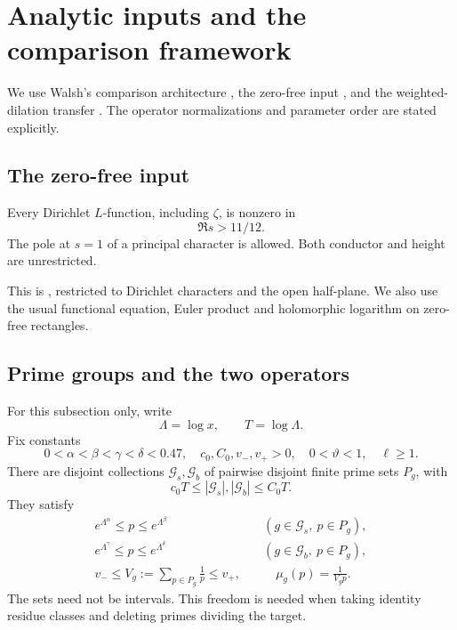 \section{Analytic inputs and the comparison framework}\label{sec:inputs}

We use Walsh's comparison architecture \cite[Sections 2--7]{walsh},
the zero-free input \cite[Theorem 3.1]{zerofree}, and the
weighted-dilation transfer \cite[Section 3]{weightedgraphs}.
The operator normalizations and parameter order are stated explicitly.

\subsection{The zero-free input}

\begin{proposition}\label{prop:zf}
Every Dirichlet \(L\)-function, including \(\zeta\), is nonzero in
\[
                         \Re s>11/12.
\]
The pole at \(s=1\) of a principal character is allowed. Both conductor
and height are unrestricted.
\end{proposition}

This is \cite[Theorem 3.1, printed p.~10]{zerofree}, restricted to
Dirichlet characters and the open half-plane. We also use the usual
functional equation, Euler product and holomorphic logarithm on
zero-free rectangles.

\subsection{Prime groups and the two operators}

For this subsection only, write
\[
                \Lambda=\log x,\qquad T=\log\Lambda.
\]
Fix constants
\[
 0<\alpha<\beta<\gamma<\delta<0.47,\quad
 c_0,C_0,v_-,v_+>0,\quad 0<\vartheta<1,\quad \ell\ge1.
\]
There are disjoint collections \(\mathcal G_s,\mathcal G_b\) of
pairwise disjoint finite prime sets \(P_g\), with
\[
 c_0T\le|\mathcal G_s|,|\mathcal G_b|\le C_0T.
\]
They satisfy
\begin{equation}
\begin{split}
 e^{\Lambda^\alpha}\le p\le e^{\Lambda^\beta}
       &\quad(g\in\mathcal G_s,\ p\in P_g),\\
 e^{\Lambda^\gamma}\le p\le e^{\Lambda^\delta}
       &\quad(g\in\mathcal G_b,\ p\in P_g),\\
 v_-\le V_g:=\sum_{p\in P_g}\frac1p\le v_+,
       &\qquad \mu_g(p)=\frac1{V_gp}.
\end{split}                                                    \label{eq:inputbanks}
\end{equation}
The sets need not be intervals. This freedom is needed when taking
identity residue classes and deleting primes dividing the target.

